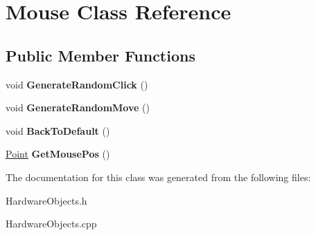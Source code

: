 \hypertarget{classMouse}{}\section{Mouse Class Reference}
\label{classMouse}
\subsection*{Public Member Functions}
\begin{DoxyCompactItemize}
\item 
\mbox{\label{classMouse_a090db1cdd50702050e51c72bdc2ab322}} 
void {\bfseries Generate\+Random\+Click} ()
\item 
\mbox{\label{classMouse_ad909fa9b80d5c9abf6b4f35a4a1ec522}} 
void {\bfseries Generate\+Random\+Move} ()
\item 
\mbox{\label{classMouse_a3bc5604b4ae13e50d2e1f7b407a052f6}} 
void {\bfseries Back\+To\+Default} ()
\item 
\mbox{\label{classMouse_a6835064c4d4f4ea8e5d85283a8fcca05}} 
\hyperlink{structPoint}{Point} {\bfseries Get\+Mouse\+Pos} ()
\end{DoxyCompactItemize}


The documentation for this class was generated from the following files\+:\begin{DoxyCompactItemize}
\item 
Hardware\+Objects.\+h\item 
Hardware\+Objects.\+cpp\end{DoxyCompactItemize}
